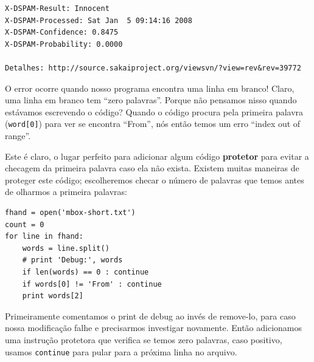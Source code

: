 \begin{enumerate}

\beforeverb
\begin{verbatim}
X-DSPAM-Result: Innocent
X-DSPAM-Processed: Sat Jan  5 09:14:16 2008
X-DSPAM-Confidence: 0.8475
X-DSPAM-Probability: 0.0000

Detalhes: http://source.sakaiproject.org/viewsvn/?view=rev&rev=39772
\end{verbatim}
\afterverb
%
O error ocorre quando nosso programa encontra uma linha em branco! Claro, uma linha em
branco tem ``zero palavras''. Porque não pensamos nisso quando estávamos escrevendo o código?
Quando o código procura pela primeira palavra (\verb"word[0]") para ver se encontra ``From'',
nós então temos um erro ``index out of range''.



Este é claro, o lugar perfeito para adicionar algum código {\bf protetor} para
evitar a checagem da primeira palavra caso ela não exista.
Existem muitas maneiras de proteger este código; escolheremos checar
o número de palavras que temos antes de olharmos a primeira palavras:



\beforeverb
\begin{verbatim}
fhand = open('mbox-short.txt')
count = 0
for line in fhand:
    words = line.split()
    # print 'Debug:', words
    if len(words) == 0 : continue
    if words[0] != 'From' : continue
    print words[2]
\end{verbatim}
\afterverb
%
Primeiramente comentamos o print de debug ao invés de remove-lo,
para caso nossa modificação falhe e precisarmos investigar novamente.
Então adicionamos uma instrução protetora que verifica se temos zero palavras, caso positivo,
usamos {\tt continue} para pular para a próxima linha no arquivo.


\end{enumerate}
